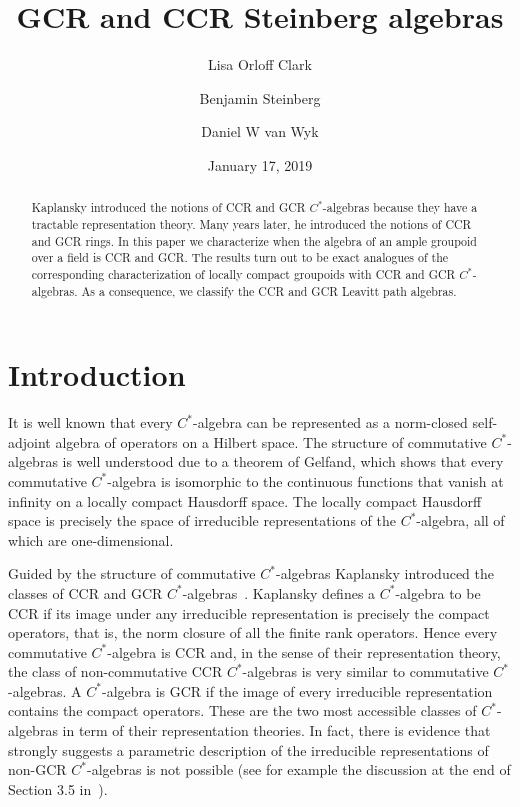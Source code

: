 \documentclass[11pt,reqno]{amsart}
\title{GCR and CCR Steinberg algebras}
\author{Lisa Orloff Clark\and Benjamin Steinberg \and Daniel W van Wyk}
\date{January 17, 2019}
\theoremstyle{plain}
\numberwithin{equation}{section}
\begin{document}
\begin{abstract}
Kaplansky introduced the notions of CCR and GCR $C^*$-algebras because they have a tractable representation theory.  Many years later, he introduced the notions of CCR and GCR rings.  In this paper we characterize when the algebra of an ample groupoid over a field is CCR and GCR. The results turn out to be exact analogues of the corresponding characterization of locally compact groupoids with CCR and GCR $C^*$-algebras. As a consequence, we classify the CCR and GCR Leavitt path algebras.
\end{abstract}


\maketitle

\section{Introduction}
It is well known that every $C^*$-algebra can be represented as a norm-closed self-adjoint  algebra of operators on a Hilbert space. The structure of commutative $C^*$-algebras is well understood due to a theorem of Gelfand, which shows that every commutative $C^*$-algebra is isomorphic to the continuous functions that vanish at infinity on a locally compact Hausdorff space. The locally compact Hausdorff space is
precisely the space of irreducible representations of the $C^*$-algebra, all of which are one-dimensional.


Guided by the structure of commutative $C^*$-algebras Kaplansky introduced the classes of CCR and GCR $C^*$-algebras~\cite{Ka51}. Kaplansky defines a $C^*$-algebra to be CCR if its image under any irreducible representation is precisely the compact operators, that is, the norm closure of  all the  finite rank operators. Hence every commutative $C^*$-algebra is CCR and, in the sense of their representation theory, the class of non-commutative CCR $C^*$-algebras is very similar to commutative $C^*$-algebras. A $C^*$-algebra is GCR if the image of every irreducible representation contains the compact operators. These are the two most accessible classes of $C^*$-algebras in term of their representation theories. In fact, there is evidence that strongly suggests a parametric description of the irreducible representations of non-GCR $C^*$-algebras is not possible (see for example the discussion at the end of Section 3.5 in~\cite{Arv76}).
\end{document}
